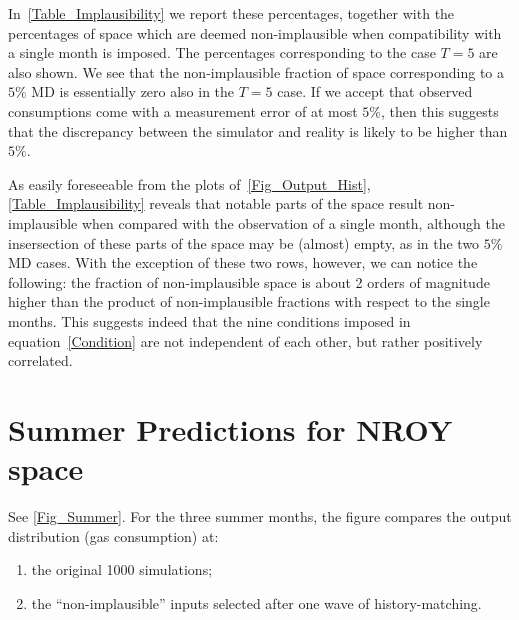 \documentclass[a4paper, 12pt]{article}
\begin{document}
In~\autoref{Table_Implausibility} we report these percentages, together with the percentages of space which are deemed non-implausible when compatibility with a single month is imposed. The percentages corresponding to the case $T=5$ are also shown. We see that the non-implausible fraction of space corresponding to a $5\%$ MD is essentially zero also in the $T=5$ case. If we accept that observed consumptions come with a measurement error of at most $5\%$, then this suggests that the discrepancy between the simulator and reality is likely to be higher than $5\%$.


As easily foreseeable from the plots of~\autoref{Fig_Output_Hist}, \autoref{Table_Implausibility} reveals that notable parts of the space result non-implausible when compared with the observation of a single month, although the insersection of these parts of the space may be (almost) empty, as in the two $5\%$ MD cases. With the exception of these two rows, however, we can notice the following: the fraction of non-implausible space is about 2 orders of magnitude higher than the product of non-implausible fractions with respect to the single months. This suggests indeed that the nine conditions imposed in equation~\eqref{Condition} are not independent of each other, but rather positively correlated.

\newpage

\section{Summer Predictions for NROY space}
See \autoref{Fig_Summer}. For the three summer months, the figure compares the output distribution (gas consumption) at:
\begin{enumerate}
\item the original 1000 simulations;
\item the ``non-implausible'' inputs selected after one wave of history-matching.
\end{enumerate}
 
\end{document}
